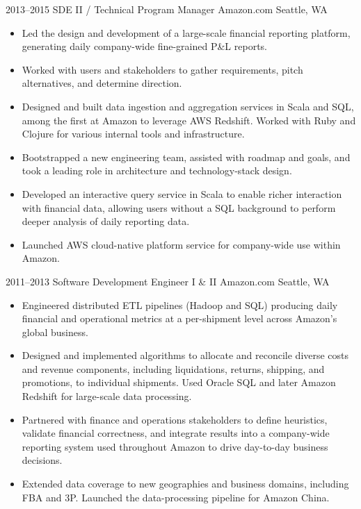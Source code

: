 \documentclass[11pt,letterpaper,sans]{moderncv}
\begin{document}
\cventry
  {2013--2015}
  {SDE II / Technical Program Manager}
  {Amazon.com}
  {Seattle, WA}
  {}
  {
    \begin{itemize}
      \item Led the design and development of a large-scale financial reporting platform, generating daily company-wide fine-grained P\&L reports.
      \item Worked with users and stakeholders to gather requirements, pitch alternatives, and determine direction.
      \item Designed and built data ingestion and aggregation services in Scala and SQL, among the first at Amazon to leverage AWS Redshift. Worked with Ruby and Clojure for various internal tools and infrastructure.
      \item Bootstrapped a new engineering team, assisted with roadmap and goals, and took a leading role in architecture and technology-stack design.
      \item Developed an interactive query service in Scala to enable richer interaction with financial data, allowing users without a SQL background to perform deeper analysis of daily reporting data.
      \item Launched AWS cloud-native platform service for company-wide use within Amazon.
    \end{itemize}
  }

\cventry
  {2011--2013}
  {Software Development Engineer I \& II}
  {Amazon.com}
  {Seattle, WA}
  {}
  {
    \begin{itemize}
    \item Engineered distributed ETL pipelines (Hadoop and SQL) producing daily financial and operational metrics at a per-shipment level across Amazon's global business.
    \item Designed and implemented algorithms to allocate and reconcile diverse costs and revenue components, including liquidations, returns, shipping, and promotions, to individual shipments. Used Oracle SQL and later Amazon Redshift for large-scale data processing.
    \item Partnered with finance and operations stakeholders to define heuristics, validate financial correctness, and integrate results into a company-wide reporting system used throughout Amazon to drive day-to-day business decisions.
    \item Extended data coverage to new geographies and business domains, including FBA and 3P. Launched the data-processing pipeline for Amazon China.
    \end{itemize}
  }
\end{document}
